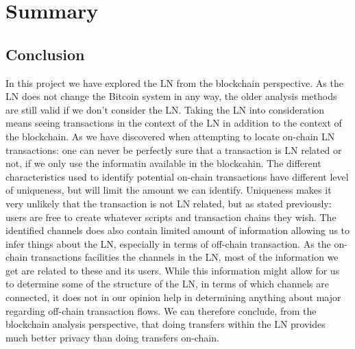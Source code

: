 \chapter{Summary}
\label{chap:conclusion}

\section{Conclusion}
In this project we have explored the LN from the blockchain perspective.
As the LN does not change the Bitcoin system in any way, the older analysis methods are still valid if we don't consider the LN. Taking the LN into consideration means seeing transactions in the context of the LN in addition to the context of the blockchain. As we have discovered when attempting to locate on-chain LN transactions: one can never be perfectly sure that a transaction is LN related or not, if we only use the informatin available in the blockcahin. The different characteristics used to identify potential on-chain transactions have different level of uniqueness, but will limit the amount we can identify. Uniqueness makes it very unlikely that the transaction is not LN related, but as stated previously: users are free to create whatever scripts and transaction chains they wish. 
The identified channels does also contain limited amount of information allowing us to infer things about the LN, especially in terms of off-chain transaction. As the on-chain transactions facilities the channels in the LN, most of the information we get are related to these and its users.
While this information might allow for us to determine some of the structure of the LN, in terms of which channels are connected, it does not in our opinion help in determining anything about major regarding off-chain transaction flows. We can therefore conclude, from the blockchain analysis perspective, that doing transfers within the LN provides much better privacy than doing transfers on-chain.
\\


